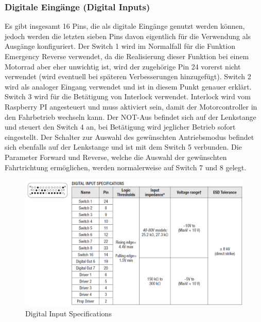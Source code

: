 \newpage

\subsubsection{Digitale Eingänge (Digital Inputs)}
Es gibt insgesamt 16 Pins, die als digitale Eingänge genutzt werden können, jedoch werden die letzten sieben Pins davon eigentlich für die Verwendung als Ausgänge konfiguriert. Der Switch 1 wird im Normalfall für die Funktion \glqq Emergency Reverse\grqq{} verwendet, da die Realisierung dieser Funktion bei einem Motorrad aber eher unwichtig ist, wird der zugehörige Pin 24 vorerst nicht verwendet (wird eventuell bei späteren Verbesserungen hinzugefügt). Switch 2 wird als analoger Eingang verwendet und ist in diesem Punkt genauer erklärt. Switch 3 wird für die Betätigung von Interlock verwendet. Interlock wird vom Raspberry PI angesteuert und muss aktiviert sein, damit der Motorcontroller in den Fahrbetrieb wechseln kann. Der NOT-Aus befindet sich auf der Lenkstange und steuert den Switch 4 an, bei Betätigung wird jeglicher Betrieb sofort eingestellt. Der Schalter zur Auswahl des gewünschten Antriebsmodus befindet sich ebenfalls auf der Lenkstange und ist mit dem Switch 5 verbunden. Die Parameter \glqq Forward\grqq{} und \glqq Reverse\grqq{}, welche die Auswahl der gewünschten Fahrtrichtung ermöglichen, werden normalerweise auf Switch 7 und 8 gelegt.

\begin{figure}[H]
	\begin{center}
		\includegraphics[width=\textwidth]{figures/antrieb/Digital_Input_Specifications.png}
		\caption{Digital Input Specifications}
	\end{center}
\end{figure}




